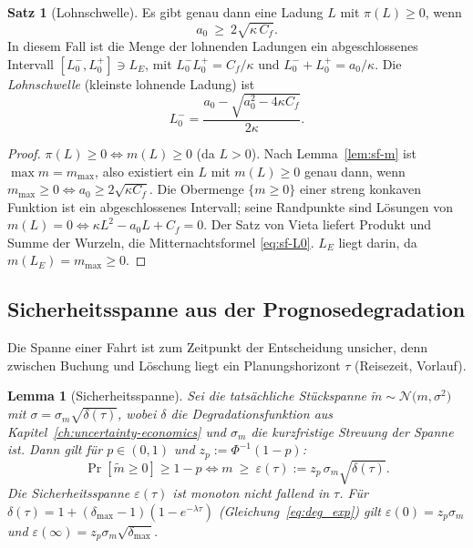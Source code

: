 \documentclass[a4paper, 12pt, twoside, openright]{report}
\newtheorem{lemma}[theorem]{Lemma}
\theoremstyle{definition}
\theoremstyle{definition}
\newtheorem{satz}{Satz}[chapter]
\begin{document}
\begin{satz}[Lohnschwelle]\label{satz:sf-lohn}
Es gibt genau dann eine Ladung $L$ mit $\pi(L)\ge0$, wenn
\begin{equation}
  a_0\ \ge\ 2\sqrt{\kappa\,C_f}.
  \label{eq:sf-lohn}
\end{equation}
In diesem Fall ist die Menge der lohnenden Ladungen ein abgeschlossenes Intervall
$[L_0^-,L_0^+]\ni L_E$, mit $L_0^-L_0^+=C_f/\kappa$ und $L_0^-+L_0^+=a_0/\kappa$.
Die \emph{Lohnschwelle} (kleinste lohnende Ladung) ist
\begin{equation}
  L_0^-=\frac{a_0-\sqrt{a_0^{2}-4\kappa C_f}}{2\kappa}.
  \label{eq:sf-L0}
\end{equation}
\end{satz}

\begin{proof}
$\pi(L)\ge0\iff m(L)\ge0$ (da $L>0$). Nach Lemma~\ref{lem:sf-m} ist
$\max m=m_{\max}$, also existiert ein $L$ mit $m(L)\ge0$ genau dann, wenn
$m_{\max}\ge0\iff a_0\ge2\sqrt{\kappa C_f}$. Die Obermenge $\{m\ge0\}$ einer streng
konkaven Funktion ist ein abgeschlossenes Intervall; seine Randpunkte sind Lösungen
von $m(L)=0\iff\kappa L^2-a_0L+C_f=0$. Der Satz von Vieta liefert Produkt und Summe
der Wurzeln, die Mitternachtsformel \eqref{eq:sf-L0}. $L_E$ liegt darin, da
$m(L_E)=m_{\max}\ge0$.
\end{proof}

\subsection{Sicherheitsspanne aus der Prognosedegradation}

Die Spanne einer Fahrt ist zum Zeitpunkt der Entscheidung unsicher, denn zwischen
Buchung und Löschung liegt ein Planungshorizont $\tau$ (Reisezeit, Vorlauf).

\begin{lemma}[Sicherheitsspanne]\label{lem:sf-eps}
Sei die tatsächliche Stückspanne $\tilde m\sim\mathcal N\bigl(m,\sigma^2\bigr)$ mit
$\sigma=\sigma_m\sqrt{\delta(\tau)}$, wobei $\delta$ die Degradationsfunktion aus
Kapitel~\ref{ch:uncertainty-economics} und $\sigma_m$ die kurzfristige
Streuung der Spanne ist. Dann gilt für $p\in(0,1)$ und $z_p:=\Phi^{-1}(1-p)$:
\begin{equation}
  \Pr[\tilde m\ge0]\ge1-p\iff m\ \ge\ \varepsilon(\tau):=z_p\,\sigma_m\sqrt{\delta(\tau)}.
  \label{eq:sf-eps}
\end{equation}
Die Sicherheitsspanne $\varepsilon(\tau)$ ist monoton nicht fallend in $\tau$. Für
$\delta(\tau)=1+(\delta_{\max}-1)(1-e^{-\lambda\tau})$ (Gleichung~\eqref{eq:deg_exp})
gilt $\varepsilon(0)=z_p\sigma_m$ und $\varepsilon(\infty)=z_p\sigma_m\sqrt{\delta_{\max}}$.
\end{lemma}
\end{document}
